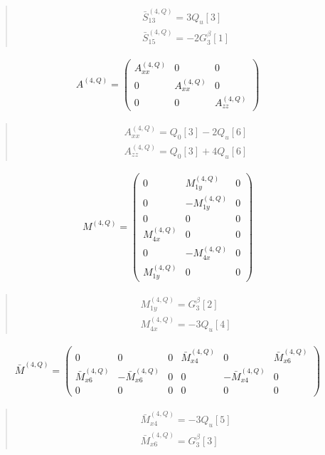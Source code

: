 \documentclass[fleqn,10pt]{jsarticle}
\begin{document}
\begin{quote}
\begin{align*}
& \bar{S}^{(4,Q)}_{13} = 3 Q_{u}[3] \\
& \bar{S}^{(4,Q)}_{15} = - 2 G_{3}^{\beta}[1]
\end{align*}
\end{quote}
\begin{align*}
A^{(4,Q)} = \begin{pmatrix} A^{(4,Q)}_{xx} & 0 & 0 \\ 0 & A^{(4,Q)}_{xx} & 0 \\ 0 & 0 & A^{(4,Q)}_{zz} \end{pmatrix}
\end{align*}
\begin{quote}
\begin{align*}
& A^{(4,Q)}_{xx} = Q_{0}[3] - 2 Q_{u}[6] \\
& A^{(4,Q)}_{zz} = Q_{0}[3] + 4 Q_{u}[6]
\end{align*}
\end{quote}
\begin{align*}
M^{(4,Q)} = \begin{pmatrix} 0 & M^{(4,Q)}_{1y} & 0 \\ 0 & - M^{(4,Q)}_{1y} & 0 \\ 0 & 0 & 0 \\ M^{(4,Q)}_{4x} & 0 & 0 \\ 0 & - M^{(4,Q)}_{4x} & 0 \\ M^{(4,Q)}_{1y} & 0 & 0 \end{pmatrix}
\end{align*}
\begin{quote}
\begin{align*}
& M^{(4,Q)}_{1y} = G_{3}^{\beta}[2] \\
& M^{(4,Q)}_{4x} = - 3 Q_{u}[4]
\end{align*}
\end{quote}
\begin{align*}
\bar{M}^{(4,Q)} = \begin{pmatrix} 0 & 0 & 0 & \bar{M}^{(4,Q)}_{x4} & 0 & \bar{M}^{(4,Q)}_{x6} \\ \bar{M}^{(4,Q)}_{x6} & - \bar{M}^{(4,Q)}_{x6} & 0 & 0 & - \bar{M}^{(4,Q)}_{x4} & 0 \\ 0 & 0 & 0 & 0 & 0 & 0 \end{pmatrix}
\end{align*}
\begin{quote}
\begin{align*}
& \bar{M}^{(4,Q)}_{x4} = - 3 Q_{u}[5] \\
& \bar{M}^{(4,Q)}_{x6} = G_{3}^{\beta}[3]
\end{align*}
\end{quote}
\end{document}
